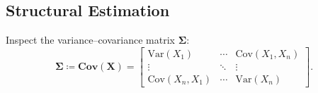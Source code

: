 
\subsection{Structural Estimation}
\label{sec:structural}

Inspect the variance--covariance matrix $\mathbfup{\Sigma}$:
\[
	\mathbfup{\Sigma} \coloneqq
	\mathbfup{Cov}(\mathbf{X}) =
	\begin{bmatrix}
		\mathup{Var}(X_1)      & \cdots & \mathup{Cov}(X_1, X_n) \\[-2.5pt]
		\vdots                 & \ddots & \vdots                 \\
		\mathup{Cov}(X_n, X_1) & \cdots & \mathup{Var}(X_n)
	\end{bmatrix}.
\]